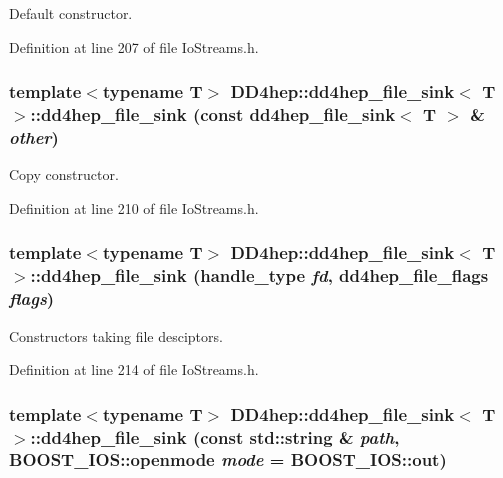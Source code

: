 Default constructor. 

Definition at line 207 of file IoStreams.h.\hypertarget{class_d_d4hep_1_1dd4hep__file__sink_ac0b723f77cc833f04bbf72fc8a5bada7}{
\subsubsection[{dd4hep\_\-file\_\-sink}]{\setlength{\rightskip}{0pt plus 5cm}template$<$typename T$>$ {\bf DD4hep::dd4hep\_\-file\_\-sink}$<$ {\bf T} $>$::{\bf dd4hep\_\-file\_\-sink} (const {\bf dd4hep\_\-file\_\-sink}$<$ {\bf T} $>$ \& {\em other})}}
\label{class_d_d4hep_1_1dd4hep__file__sink_ac0b723f77cc833f04bbf72fc8a5bada7}


Copy constructor. 

Definition at line 210 of file IoStreams.h.\hypertarget{class_d_d4hep_1_1dd4hep__file__sink_a6dd2a25c79f1bf4d26b8c4475d58b795}{
\subsubsection[{dd4hep\_\-file\_\-sink}]{\setlength{\rightskip}{0pt plus 5cm}template$<$typename T$>$ {\bf DD4hep::dd4hep\_\-file\_\-sink}$<$ {\bf T} $>$::{\bf dd4hep\_\-file\_\-sink} ({\bf handle\_\-type} {\em fd}, \/  {\bf dd4hep\_\-file\_\-flags} {\em flags})}}
\label{class_d_d4hep_1_1dd4hep__file__sink_a6dd2a25c79f1bf4d26b8c4475d58b795}


Constructors taking file desciptors. 

Definition at line 214 of file IoStreams.h.\hypertarget{class_d_d4hep_1_1dd4hep__file__sink_a9a5a2c30b5fed19f85593ccc16349e96}{
\subsubsection[{dd4hep\_\-file\_\-sink}]{\setlength{\rightskip}{0pt plus 5cm}template$<$typename T$>$ {\bf DD4hep::dd4hep\_\-file\_\-sink}$<$ {\bf T} $>$::{\bf dd4hep\_\-file\_\-sink} (const std::string \& {\em path}, \/  BOOST\_\-IOS::openmode {\em mode} = {\ttfamily BOOST\_\-IOS::out})}}
\label{class_d_d4hep_1_1dd4hep__file__sink_a9a5a2c30b5fed19f85593ccc16349e96}


